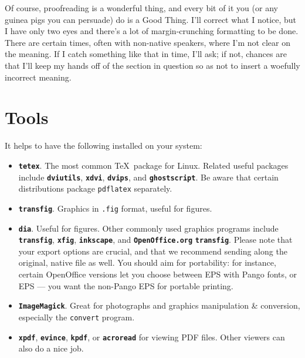 \documentclass[final]{ols}
\begin{document}
Of course, proofreading is a wonderful thing, and every bit of it you
(or any guinea pigs you can persuade) do is a Good Thing.  I'll
correct what I notice, but I have only two eyes and there's a lot of
margin-crunching formatting to be done.  There are certain
times, often with non-native speakers, where I'm not clear on the
meaning.  If I catch something like that in time, I'll ask; if not,
chances are that I'll keep my hands off of the section in question so
as not to insert a woefully incorrect meaning. 

\section{Tools}

It helps to have the following installed on your system:
\begin{itemize}

\item \textbf{\texttt{tetex}}.  The most common \TeX\ package for Linux.
  Related useful packages include \textbf{\texttt{dviutils}}, \textbf{\texttt{xdvi}},
  \textbf{\texttt{dvips}}, and \textbf{\texttt{ghostscript}}.  Be aware that
  certain distributions package \texttt{pdflatex} separately.

\item \textbf{\texttt{transfig}}.  Graphics in \texttt{.fig} format,
  useful for figures. 

\item \textbf{\texttt{dia}}.  Useful for figures.  Other commonly used
  graphics programs include \textbf{\texttt{transfig}}, \textbf{\texttt{xfig}},
  \textbf{\texttt{inkscape}}, and \textbf{\texttt{OpenOffice.org}}
  \textbf{\texttt{transfig}}.  Please note that your export options are
  crucial, and 
  that we recommend sending along the original, native file as well.
  You should aim for portability: for instance, certain OpenOffice
  versions let you choose between EPS with Pango fonts, or EPS --- you
  want the non-Pango EPS for portable printing.

\item \textbf{\texttt{ImageMagick}}.  Great for photographs and graphics
  manipulation \& conversion, especially the \texttt{convert} program.

\item \textbf{\texttt{xpdf}}, \textbf{\texttt{evince}}, \textbf{\texttt{kpdf}}, or
  \textbf{\texttt{acroread}} for viewing PDF files.  Other viewers can also do
  a nice job. 


\end{itemize}
\end{document}
